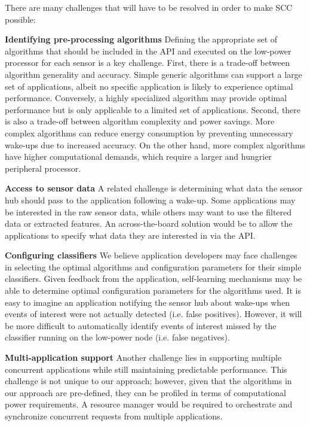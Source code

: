 There are many challenges that will have to be resolved in order to
make SCC possible:

{\bf Identifying pre-processing algorithms} Defining the appropriate
set of algorithms that should be included in the API and executed on
the low-power processor for each sensor is a key challenge. First,
there is a trade-off between algorithm generality and accuracy.
Simple generic algorithms can support a large set of
applications, albeit no specific application is likely to experience
optimal performance.  Conversely, a highly specialized algorithm may
provide optimal performance but is only applicable to a limited set of
applications.  Second, there is also a trade-off between algorithm
complexity and power savings.  More complex algorithms can reduce
energy consumption by preventing unnecessary wake-ups due to increased
accuracy. On the other hand, more complex algorithms have higher
computational demands, which require a larger and hungrier peripheral
processor.

{\bf Access to sensor data} A related challenge is determining what
data the sensor hub should pass to the application following a
wake-up. Some applications may be interested in the raw sensor data,
while others may want to use the filtered data or extracted features.
An across-the-board solution would be to allow the applications to
specify what data they are interested in via the API.

{\bf Configuring classifiers} We believe application developers may
face challenges in selecting the optimal algorithms and configuration
parameters for their simple classifiers.  Given feedback from the
application, self-learning mechanisms may be able to determine optimal
configuration parameters for the algorithms used.  It is easy to 
imagine an application notifying the
sensor hub about wake-ups when events of interest were not actually
detected (i.e. false positives).  However, it will be more difficult
to automatically identify events of interest missed by the classifier
running on the low-power node (i.e. false negatives).

{\bf Multi-application support} Another challenge lies in supporting
multiple concurrent applications while still maintaining predictable
performance.  This challenge is not unique to our approach; however,
given that the algorithms in our approach are pre-defined, they can be
profiled in terms of computational power requirements.  A resource
manager would be required to orchestrate and synchronize concurrent
requests from multiple applications.


